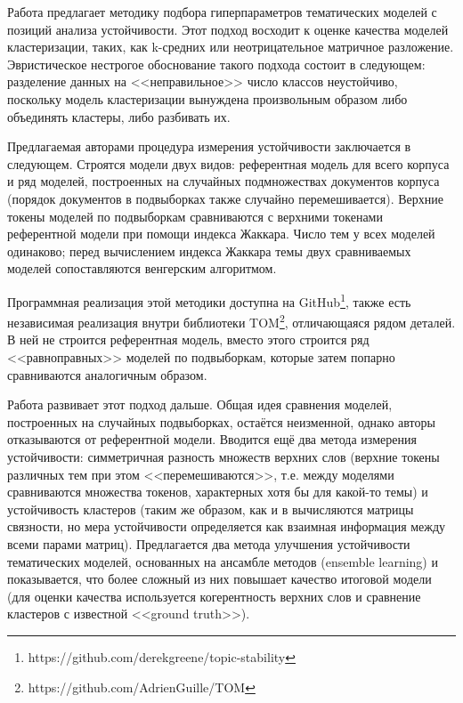 Работа \cite{greene14howmany} предлагает методику подбора гиперпараметров тематических моделей с позиций анализа устойчивости. Этот подход восходит к оценке качества моделей кластеризации, таких, как k-средних или неотрицательное матричное разложение. Эвристическое нестрогое обоснование такого подхода состоит в следующем: разделение данных на <<неправильное>> число классов неустойчиво, поскольку модель кластеризации вынуждена произвольным образом либо объединять кластеры, либо разбивать их.

Предлагаемая авторами процедура измерения устойчивости заключается в следующем. Строятся модели двух видов: референтная модель для всего корпуса и ряд моделей, построенных на случайных подмножествах документов корпуса (порядок документов в подвыборках также случайно перемешивается). Верхние токены моделей по подвыборкам сравниваются с верхними токенами референтной модели при помощи индекса Жаккара. Число тем у всех моделей одинаково; перед вычислением индекса Жаккара темы двух сравниваемых моделей сопоставляются венгерским алгоритмом.

Программная реализация этой методики доступна на GitHub\footnote{https://github.com/derekgreene/topic-stability}, также есть независимая реализация внутри библиотеки TOM\footnote{https://github.com/AdrienGuille/TOM}, отличающаяся рядом деталей. В ней не строится референтная модель, вместо этого строится ряд <<равноправных>> моделей по подвыборкам, которые затем попарно сравниваются аналогичным образом.

Работа \cite{belford2018stability} развивает этот подход дальше. Общая идея сравнения моделей, построенных на случайных подвыборках, остаётся неизменной, однако авторы отказываются от референтной модели. Вводится ещё два метода измерения устойчивости: симметричная разность множеств верхних слов (верхние токены различных тем при этом <<перемешиваются>>, т.е. между моделями сравниваются множества токенов, характерных хотя бы для какой-то темы) и устойчивость кластеров (таким же образом, как и в \cite{Brunet4164} вычисляются матрицы связности, но мера устойчивости определяется как взаимная информация между всеми парами матриц). Предлагается два метода улучшения устойчивости тематических моделей, основанных на ансамбле методов (ensemble learning) и показывается, что более сложный из них повышает качество итоговой модели (для оценки качества используется когерентность верхних слов и сравнение кластеров с известной <<ground truth>>).

